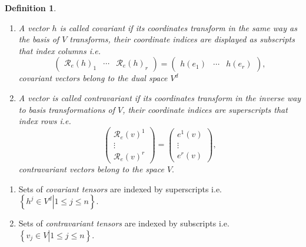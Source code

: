 \documentclass[aps,preprint]{revtex4}
\newtheorem{definition}[theorem]{Definition}
\begin{document}
\begin{definition}
\begin{enumerate}
\item A vector $h$ is called \emph{covariant} if its coordinates transform
in the same way as the basis of $V$ transforms, their coordinate indices are
displayed as subscripts that index columns i.e. 
\begin{equation}
\left( 
\begin{array}{ccc}
\mathcal{R}_{e}\left( h\right) _{1} & \cdots & \mathcal{R}_{e}\left(
h\right) _{r}%
\end{array}%
\right) =\left( 
\begin{array}{ccc}
h\left( e_{1}\right) & \cdots & h\left( e_{r}\right)%
\end{array}%
\right) ,
\end{equation}%
covariant vectors belong to the dual space $V^{d}$

\item A vector is called \emph{contravariant} if its coordinates transform
in the inverse way to basis transformations of $V$, their coordinate indices
are superscripts that index rows i.e. 
\begin{equation}
\left( 
\begin{array}{c}
\mathcal{R}_{e}\left( v\right) ^{1} \\ 
\vdots \\ 
\mathcal{R}_{e}\left( v\right) ^{r}%
\end{array}%
\right) =\left( 
\begin{array}{c}
e^{1}\left( v\right) \\ 
\vdots \\ 
e^{r}\left( v\right)%
\end{array}%
\right) ,
\end{equation}%
contravariant vectors belong to the space $V.$
\end{enumerate}
\end{definition}

\begin{enumerate}
\item Sets of \emph{covariant tensors} are indexed by superscripts i.e. $%
\left\{ \left. h^{j}\in V^{d}\right\vert 1\leq j\leq n\right\} .$

\item Sets of \emph{contravariant tensors} are indexed by subscripts i.e. $%
\left\{ \left. v_{j}\in V\right\vert 1\leq j\leq n\right\} .$
\end{enumerate}
\end{document}
